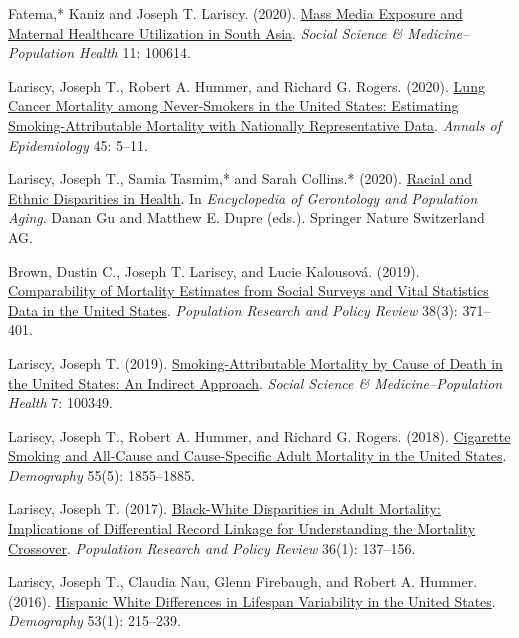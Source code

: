 \documentclass[11pt,]{article}
\begin{document}
Fatema,* Kaniz and Joseph T. Lariscy. (2020).
\href{https://www.sciencedirect.com/science/article/pii/S2352827320302512}{Mass
Media Exposure and Maternal Healthcare Utilization in South Asia}.
\emph{Social Science \& Medicine--Population Health} 11: 100614.

Lariscy, Joseph T., Robert A. Hummer, and Richard G. Rogers. (2020).
\href{https://www.sciencedirect.com/science/article/pii/S1047279720301393}{Lung
Cancer Mortality among Never-Smokers in the United States: Estimating
Smoking-Attributable Mortality with Nationally Representative Data}.
\emph{Annals of Epidemiology} 45: 5--11.

Lariscy, Joseph T., Samia Tasmim,* and Sarah Collins.* (2020).
\href{https://www.researchgate.net/publication/342352707_Racial_and_Ethnic_Disparities_in_Health}{Racial
and Ethnic Disparities in Health}. In \emph{Encyclopedia of Gerontology
and Population Aging}. Danan Gu and Matthew E. Dupre (eds.). Springer
Nature Switzerland AG.

Brown, Dustin C., Joseph T. Lariscy, and Lucie Kalousová. (2019).
\href{https://link.springer.com/article/10.1007/s11113-018-9505-1}{Comparability
of Mortality Estimates from Social Surveys and Vital Statistics Data in
the United States}. \emph{Population Research and Policy Review} 38(3):
371--401.

Lariscy, Joseph T. (2019).
\href{https://www.sciencedirect.com/science/article/pii/S2352827318302118?via\%3Dihub}{Smoking-Attributable
Mortality by Cause of Death in the United States: An Indirect Approach}.
\emph{Social Science \& Medicine--Population Health} 7: 100349.

Lariscy, Joseph T., Robert A. Hummer, and Richard G. Rogers. (2018).
\href{https://read.dukeupress.edu/demography/article/55/5/1855/167925/Cigarette-Smoking-and-All-Cause-and-Cause-Specific}{Cigarette
Smoking and All-Cause and Cause-Specific Adult Mortality in the United
States}. \emph{Demography} 55(5): 1855--1885.

Lariscy, Joseph T. (2017).
\href{https://link.springer.com/article/10.1007/s11113-016-9415-z}{Black-White
Disparities in Adult Mortality: Implications of Differential Record
Linkage for Understanding the Mortality Crossover}. \emph{Population
Research and Policy Review} 36(1): 137--156.

Lariscy, Joseph T., Claudia Nau, Glenn Firebaugh, and Robert A. Hummer.
(2016).
\href{https://read.dukeupress.edu/demography/article/53/1/215/167323/Hispanic-White-Differences-in-Lifespan-Variability}{Hispanic
White Differences in Lifespan Variability in the United States}.
\emph{Demography} 53(1): 215--239.
\end{document}
